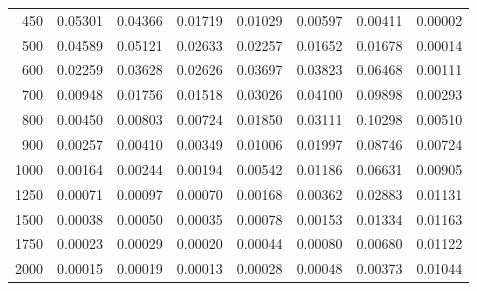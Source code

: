 \begin{table}[ht]
\begin{tabular}{r|c|c|c|c|c|c|c}
      450 & 0.05301 & 0.04366 & 0.01719 & 0.01029 & 0.00597 & 0.00411 & 0.00002 \\
      500 & 0.04589 & 0.05121 & 0.02633 & 0.02257 & 0.01652 & 0.01678 & 0.00014 \\
      600 & 0.02259 & 0.03628 & 0.02626 & 0.03697 & 0.03823 & 0.06468 & 0.00111 \\
      700 & 0.00948 & 0.01756 & 0.01518 & 0.03026 & 0.04100 & 0.09898 & 0.00293 \\
      800 & 0.00450 & 0.00803 & 0.00724 & 0.01850 & 0.03111 & 0.10298 & 0.00510 \\
      900 & 0.00257 & 0.00410 & 0.00349 & 0.01006 & 0.01997 & 0.08746 & 0.00724 \\
     1000 & 0.00164 & 0.00244 & 0.00194 & 0.00542 & 0.01186 & 0.06631 & 0.00905 \\
     1250 & 0.00071 & 0.00097 & 0.00070 & 0.00168 & 0.00362 & 0.02883 & 0.01131 \\
     1500 & 0.00038 & 0.00050 & 0.00035 & 0.00078 & 0.00153 & 0.01334 & 0.01163 \\
     1750 & 0.00023 & 0.00029 & 0.00020 & 0.00044 & 0.00080 & 0.00680 & 0.01122 \\
     2000 & 0.00015 & 0.00019 & 0.00013 & 0.00028 & 0.00048 & 0.00373 & 0.01044 \\ \cline{1-8}
    \end{tabular}
    \label{tab:XRayEffOCX4}
\end{table}

